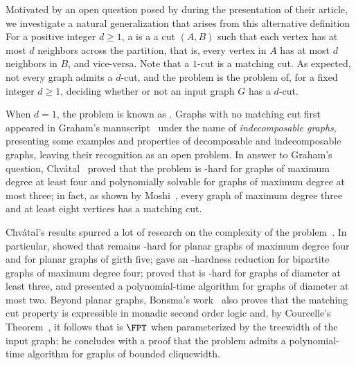 Motivated by an open question posed by \cite{matching_cut_ipec} during the presentation of their article,  we investigate a natural generalization that arises from this alternative definition
For a positive integer $d \geq 1$, a  is a a cut $(A, B)$ such that each vertex has at most $d$ neighbors across the partition, that is, every vertex in $A$ has at most $d$ neighbors in $B$, and vice-versa. Note that a $1$-cut is a matching cut.
As expected, not every graph admits a $d$-cut, and the  problem is the problem of, for a fixed integer $d \geq 1$, deciding whether or not an input graph $G$ has a $d$-cut.


When $d=1$, the problem is known as .
Graphs with no matching cut first appeared in Graham's manuscript~\cite{matching_cut_graham} under the name of \textit{indecomposable graphs}, presenting some examples and properties of decomposable and indecomposable graphs, leaving their recognition as an open problem.
In answer to Graham's question, Chv\'atal~\cite{chvatal_matching_cut} proved that the problem is \NP-hard for graphs of maximum degree at least four and polynomially solvable for graphs of maximum degree at most three; in fact, as shown by Moshi~\cite{matching_cut_moshi}, every graph of maximum degree three and at least eight vertices has a matching cut.

Chvátal's results spurred a lot of research on the complexity of the problem~\citep{matching_cut_ipec,matching_cut_structural,matching_cut_tcs, matching_cut_diameter, matching_cut_planar, matching_cut_series_parallel, stable_cutset_line_graphs}.
In particular, \cite{matching_cut_planar} showed that  remains \NP-hard for planar graphs of maximum degree four and for planar graphs of girth five;
\cite{stable_cutset_line_graphs} gave an \NP-hardness reduction for bipartite graphs of maximum degree four;
\cite{matching_cut_diameter} proved that  is \NP-hard for graphs of diameter at least three, and presented a polynomial-time algorithm for graphs of diameter at most two.
Beyond planar graphs, Bonsma's work~\citep{matching_cut_planar} also proves that the matching cut property is expressible in monadic second order logic and, by Courcelle's Theorem~\citep{courcelle_theorem}, it follows that  is $\FPT$ when parameterized by the treewidth of the input graph; he concludes with a proof that the problem admits a polynomial-time algorithm for graphs of bounded cliquewidth.

